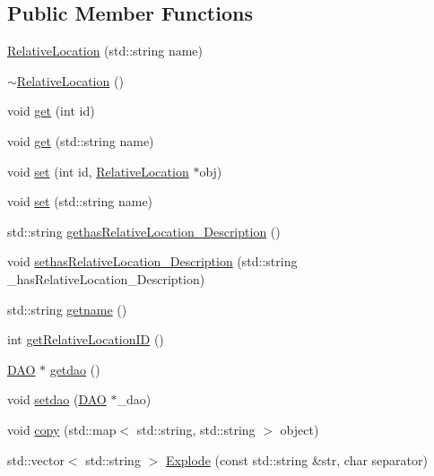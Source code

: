 \subsection*{Public Member Functions}
\begin{DoxyCompactItemize}
\item 
\hyperlink{class_relative_location_a5774daa8dd553d7dfcedbd88d2082dc4}{RelativeLocation} (std::string name)
\item 
\hyperlink{class_relative_location_aafffdb9516e24a8e9d12ef464adb1493}{$\sim$RelativeLocation} ()
\item 
void \hyperlink{class_relative_location_aba3ac6526140bd3e9ea10b2c08362daa}{get} (int id)
\item 
void \hyperlink{class_relative_location_a5a3ae66baa899f3b26e906087a880955}{get} (std::string name)
\item 
void \hyperlink{class_relative_location_a2af5fa73daeeb203ecddf34f8b78d5c9}{set} (int id, \hyperlink{class_relative_location}{RelativeLocation} $\ast$obj)
\item 
void \hyperlink{class_relative_location_a42d75e6b768859f46d5b52c6fd9786e4}{set} (std::string name)
\item 
std::string \hyperlink{class_relative_location_a355537992ee0f5c76824bf98bef306db}{gethasRelativeLocation\_\-Description} ()
\item 
void \hyperlink{class_relative_location_ac3509946f3badacb69f9f6cce759f8f7}{sethasRelativeLocation\_\-Description} (std::string \_\-hasRelativeLocation\_\-Description)
\item 
std::string \hyperlink{class_relative_location_a6cbb08ce7d4aedfd5d1d0ea768ede450}{getname} ()
\item 
int \hyperlink{class_relative_location_af1fb2ff976f8c85a7d6b4d0ab38c40c5}{getRelativeLocationID} ()
\item 
\hyperlink{class_d_a_o}{DAO} $\ast$ \hyperlink{class_relative_location_add367c3d25d6016ba594c5a5b1b0ea79}{getdao} ()
\item 
void \hyperlink{class_relative_location_a90865b7d18772c0fd40e71b2132f3f06}{setdao} (\hyperlink{class_d_a_o}{DAO} $\ast$\_\-dao)
\item 
void \hyperlink{class_relative_location_a6d65314256e2d61ce505454dfd923b61}{copy} (std::map$<$ std::string, std::string $>$ object)
\item 
std::vector$<$ std::string $>$ \hyperlink{class_relative_location_a4993310ecce155ea78de75b56f65ac79}{Explode} (const std::string \&str, char separator)
\end{DoxyCompactItemize}


